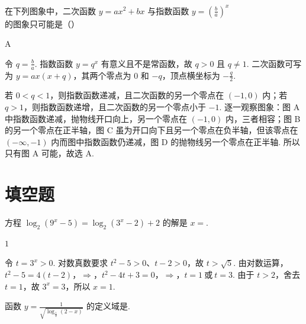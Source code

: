 \documentclass[UTF8,a4paper,oneside,11pt]{ctexbook}
\begin{document}
\begin{problem}
在下列图象中，二次函数 \(y=ax^2+bx\) 与指数函数 \(y=\left(\frac{b}{a}\right)^x\) 的图象只可能是（\quad）

\choices
    {}
    {}
    {}
    {}
\end{problem}

\begin{answer}
A
\end{answer}

\begin{solution}
令 \(q=\frac{b}{a}\). 指数函数 \(y=q^x\) 有意义且不是常函数，故 \(q>0\) 且 \(q\neq1\). 二次函数可写为 \(y=ax(x+q)\)，其两个零点为 \(0\) 和 \(-q\)，顶点横坐标为 \(-\frac{q}{2}\).

若 \(0<q<1\)，则指数函数递减，且二次函数的另一个零点在 \((-1,0)\) 内；若 \(q>1\)，则指数函数递增，且二次函数的另一个零点小于 \(-1\). 逐一观察图象：图 A 中指数函数递减，抛物线开口向上，另一个零点在 \((-1,0)\) 内，三者相容；图 B 的另一个零点在正半轴，图 C 虽为开口向下且另一个零点在负半轴，但该零点在 \((-\infty,-1)\) 内而图中指数函数仍递减，图 D 的抛物线另一个零点在正半轴. 所以只有图 A 可能，故选 A.
\end{solution}

\section{填空题}

\begin{problem}
方程 \(\log_{2}\left(9^x-5\right)=\log_{2}\left(3^x-2\right)+2\) 的解是 \(x=\)\fillinblank{}.
\end{problem}

\begin{answer}
\(1\)
\end{answer}

\begin{solution}
令 \(t=3^x>0\). 对数真数要求 \(t^2-5>0\)、\(t-2>0\)，故 \(t>\sqrt{5}\). 由对数运算，
\(t^2-5=4(t-2)\)，\(\Longrightarrow\)，\(t^2-4t+3=0\)，\(\Longrightarrow\)，\(t=1\ \text{或}\ t=3\).
由于 \(t>2\)，舍去 \(t=1\)，故 \(3^x=3\)，所以 \(x=1\).
\end{solution}

\begin{problem}
函数 \(y=\frac{1}{\sqrt{\log_{\frac{1}{2}}(2-x)}}\) 的定义域是\fillinblank{}.
\end{problem}
\end{document}
